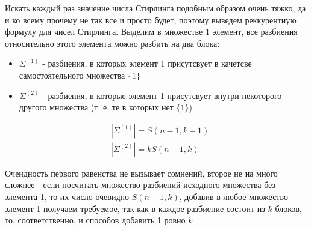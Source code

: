 Искать каждый раз значение числа Стирлинга подобным образом очень тяжко, да и ко всему прочему не так все и просто будет, поэтому выведем реккурентную формулу для чисел Стирлинга. Выделим в множестве 1 элемент, все разбиения относительно этого элемента можно разбить на два блока:
\begin{itemize}
\item $\Sigma^{\left(1\right)}$ - разбиения, в которых элемент 1 присутсвует в качетсве самостоятельного множества $\{1\}$

\item $\Sigma^{\left(2\right)}$ - разбиения, в которые элемент 1 присутсвует внутри некоторого другого множества (т. е. те в которых нет $\{1\}$)
\end{itemize}

\[
	\begin{split}
		& \left|\Sigma^{\left(1\right)}\right| = S \left(n-1, k-1\right) \\
		& \left|\Sigma^{\left(2\right)}\right| = k S \left(n-1, k\right)
	\end{split}
\]

Очеидность первого равенства не вызывает сомнений, второе не на много сложнее - если посчитать множество разбиений исходного множества без элемента 1, то их число очевидно $S \left(n-1,k\right)$, добавив в любое множество элемент 1 получаем требуемое, так как в каждое разбиение состоит из $k$ блоков, то, соответственно, и способов добавить 1 ровно $k$
